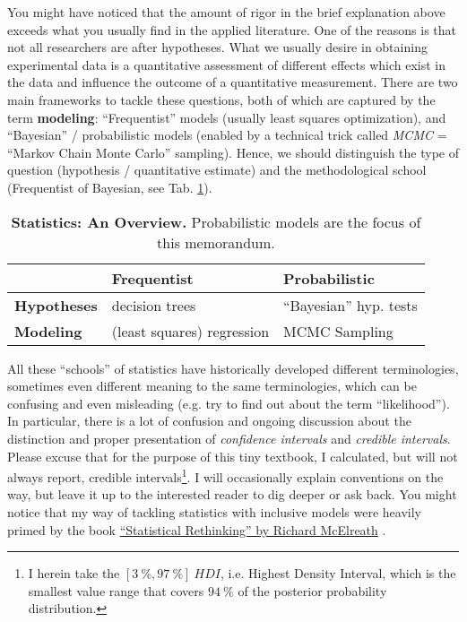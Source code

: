 You might have noticed that the amount of rigor in the brief explanation above exceeds what you usually find in the applied literature.
One of the reasons is that not all researchers are after hypotheses.
What we usually desire in obtaining experimental data is a quantitative assessment of different effects which exist in the data and influence the outcome of a quantitative measurement.
There are two main frameworks to tackle these questions, both of which are captured by the term \textbf{modeling}: ``Frequentist'' models (usually least squares optimization), and ``Bayesian'' / probabilistic models (enabled by a technical trick called \emph{MCMC} = ``Markov Chain Monte Carlo'' sampling).
Hence, we should distinguish the type of question (hypothesis / quantitative estimate) and the methodological school (Frequentist of Bayesian, see Tab. \ref{tab:statistics}).

\begin{table}[htbp]
\caption{\label{tab:statistics}\textbf{Statistics: An Overview.} Probabilistic models are the focus of this memorandum.}
\centering
\begin{tabular}{|l|l|l|}
\hline
 & \textbf{Frequentist} & \textbf{Probabilistic}\\[0pt]
\hline
\textbf{Hypotheses} & decision trees & ``Bayesian'' hyp. tests\\[0pt]
\hline
\textbf{Modeling} & (least squares) regression & MCMC Sampling\\[0pt]
\hline
\end{tabular}
\end{table}



All these ``schools'' of statistics have historically developed different terminologies, sometimes even different meaning to the same terminologies, which can be confusing and even misleading (e.g. try to find out about the term ``likelihood'').
In particular, there is a lot of confusion and ongoing discussion about the distinction and proper presentation of \emph{confidence intervals} and \emph{credible intervals}.
Please excuse that for the purpose of this tiny textbook, I calculated, but will not always report, credible intervals\footnote{I herein take the $\left[3\ \%,97\ \%\right]\ HDI$, i.e. Highest Density Interval, which is the smallest value range that covers $94\ \%$ of the posterior probability distribution.}.
I will occasionally explain conventions on the way, but leave it up to the interested reader to dig deeper or ask back.
You might notice that my way of tackling statistics with inclusive models were heavily primed by the book \href{https://xcelab.net/rm/statistical-rethinking/}{``Statistical Rethinking'' by Richard McElreath} \citep{McElreath2018}.



